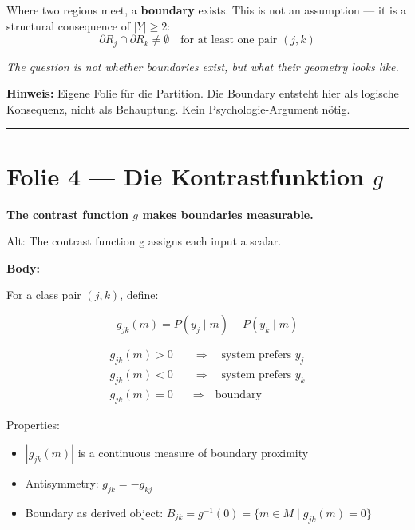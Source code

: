 \documentclass[11pt, a4paper]{article}
\newcommand{\actiontitle}[1]{{\Large\bfseries\color{tumdark} #1}\par\vspace{0.3em}}
\newcommand{\oldtitle}[1]{{\small\color{gray} Alt: #1}\par}
\newcommand{\slidenote}[1]{{\small\color{accent}\textbf{Hinweis:} #1}\par}
\begin{document}
Where two regions meet, a \textbf{boundary} exists. This is not an assumption --- it is a structural consequence of $|Y| \geq 2$:
%
\begin{equation}
\partial R_{j} \cap \partial R_{k} \neq \emptyset \quad \text{for at least one pair } (j, k)
\end{equation}

\textit{The question is not \emph{whether} boundaries exist, but what their geometry looks like.}

\slidenote{Eigene Folie f\"ur die Partition. Die Boundary entsteht hier als logische Konsequenz, nicht als Behauptung. Kein Psychologie-Argument n\"otig.}

\bigskip\hrule\bigskip

\section*{Folie 4 --- Die Kontrastfunktion $g$}

\actiontitle{The contrast function $g$ makes boundaries measurable.}

\oldtitle{The contrast function g assigns each input a scalar.}

\textbf{Body:}

For a class pair $(j, k)$, define:
%
\begin{tcolorbox}[colframe=tumblue, colback=white]
\begin{equation}
g_{jk}(m) = P(y_j \mid m) - P(y_k \mid m)
\end{equation}
\end{tcolorbox}

\begin{align}
g_{jk}(m) > 0  &\quad \Rightarrow \quad \text{system prefers } y_j \\
g_{jk}(m) < 0  &\quad \Rightarrow \quad \text{system prefers } y_k \\
g_{jk}(m) = 0  &\quad \Rightarrow \quad \text{boundary}
\end{align}

Properties:
\begin{itemize}[nosep]
\item $|g_{jk}(m)|$ is a continuous measure of boundary proximity
\item Antisymmetry: $g_{jk} = -g_{kj}$
\item Boundary as derived object: $B_{jk} = g^{-1}(0) = \{m \in M \mid g_{jk}(m) = 0\}$
\end{itemize}
\end{document}
